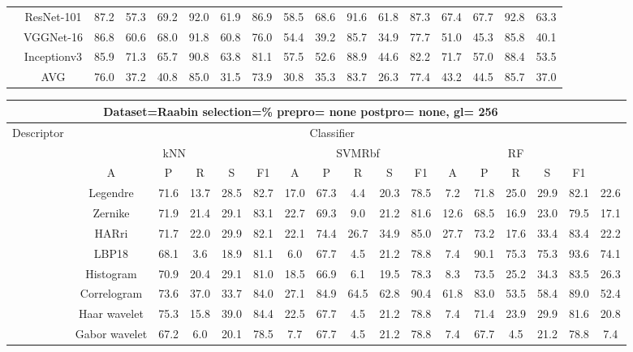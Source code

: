 \documentclass[12pt,italian]{article}
\begin{document}
\begin{tiny}
\begin{longtable}{lcccccccccccccccc}
& ResNet-101 & 87.2 & 57.3 & 69.2 & 92.0 & 61.9 & 86.9 & 58.5 & 68.6 & 91.6 & 61.8 & 87.3 & 67.4 & 67.7 & 92.8 & 63.3 \\ 
& VGGNet-16 & 86.8 & 60.6 & 68.0 & 91.8 & 60.8 & 76.0 & 54.4 & 39.2 & 85.7 & 34.9 & 77.7 & 51.0 & 45.3 & 85.8 & 40.1 \\ 
& Inceptionv3 & 85.9 & 71.3 & 65.7 & 90.8 & 63.8 & 81.1 & 57.5 & 52.6 & 88.9 & 44.6 & 82.2 & 71.7 & 57.0 & 88.4 & 53.5 \\ 
\hline
& AVG & 76.0 & 37.2 & 40.8 & 85.0 & 31.5 & 73.9 & 30.8 & 35.3 & 83.7 & 26.3 & 77.4 & 43.2 & 44.5 & 85.7 & 37.0 \\ 
\hline
\bottomrule
\end{longtable} 

 \pagebreak 
\begin{longtable}{lcccccccccccccccc}
\toprule
\multicolumn{16}{c}{Dataset=Raabin selection=\% prepro= none postpro= none, gl= 256} \\ 
\toprule
Descriptor & \multicolumn{15}{c}{Classifier} \\ 
& \multicolumn{5}{c}{kNN} & \multicolumn{5}{c}{SVMRbf} & \multicolumn{5}{c}{RF} \\ 
& A & P & R & S & F1 & A & P & R & S & F1 & A & P & R & S & F1 \\ 
\midrule
& Legendre & 71.6 & 13.7 & 28.5 & 82.7 & 17.0 & 67.3 &  4.4 & 20.3 & 78.5 &  7.2 & 71.8 & 25.0 & 29.9 & 82.1 & 22.6 \\ 
& Zernike & 71.9 & 21.4 & 29.1 & 83.1 & 22.7 & 69.3 &  9.0 & 21.2 & 81.6 & 12.6 & 68.5 & 16.9 & 23.0 & 79.5 & 17.1 \\ 
& HARri & 71.7 & 22.0 & 29.9 & 82.1 & 22.1 & 74.4 & 26.7 & 34.9 & 85.0 & 27.7 & 73.2 & 17.6 & 33.4 & 83.4 & 22.2 \\ 
& LBP18 & 68.1 &  3.6 & 18.9 & 81.1 &  6.0 & 67.7 &  4.5 & 21.2 & 78.8 &  7.4 & 90.1 & 75.3 & 75.3 & 93.6 & 74.1 \\ 
& Histogram & 70.9 & 20.4 & 29.1 & 81.0 & 18.5 & 66.9 &  6.1 & 19.5 & 78.3 &  8.3 & 73.5 & 25.2 & 34.3 & 83.5 & 26.3 \\ 
& Correlogram & 73.6 & 37.0 & 33.7 & 84.0 & 27.1 & 84.9 & 64.5 & 62.8 & 90.4 & 61.8 & 83.0 & 53.5 & 58.4 & 89.0 & 52.4 \\ 
& Haar wavelet & 75.3 & 15.8 & 39.0 & 84.4 & 22.5 & 67.7 &  4.5 & 21.2 & 78.8 &  7.4 & 71.4 & 23.9 & 29.9 & 81.6 & 20.8 \\ 
& Gabor wavelet & 67.2 &  6.0 & 20.1 & 78.5 &  7.7 & 67.7 &  4.5 & 21.2 & 78.8 &  7.4 & 67.7 &  4.5 & 21.2 & 78.8 &  7.4 \\ 

\end{longtable}
\end{tiny}
\end{document}
